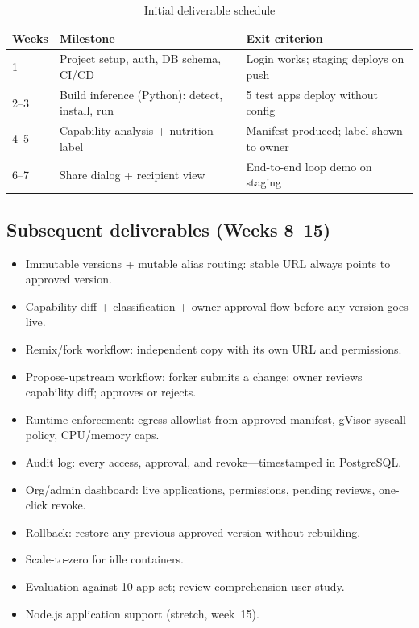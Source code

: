 \documentclass[11pt,a4paper]{article}
\begin{document}
\begin{table}[h]
\centering
\begin{tabular}{@{}p{1.8cm}p{5.8cm}p{5.6cm}@{}}
\toprule
\textbf{Weeks} & \textbf{Milestone} & \textbf{Exit criterion} \\
\midrule
1
  & Project setup, auth, DB schema, CI/CD
  & Login works; staging deploys on push \\
2--3
  & Build inference (Python): detect, install, run
  & 5 test apps deploy without config \\
4--5
  & Capability analysis + nutrition label
  & Manifest produced; label shown to owner \\
6--7
  & Share dialog + recipient view
  & End-to-end loop demo on staging \\
\bottomrule
\end{tabular}
\caption{Initial deliverable schedule}
\end{table}

\subsection{Subsequent deliverables (Weeks 8--15)}

\begin{itemize}[leftmargin=0.7cm]
  \item Immutable versions + mutable alias routing: stable URL always points to
    approved version.
  \item Capability diff + classification + owner approval flow before any version
    goes live.
  \item Remix/fork workflow: independent copy with its own URL and permissions.
  \item Propose-upstream workflow: forker submits a change; owner reviews capability
    diff; approves or rejects.
  \item Runtime enforcement: egress allowlist from approved manifest, gVisor syscall
    policy, CPU/memory caps.
  \item Audit log: every access, approval, and revoke---timestamped in PostgreSQL.
  \item Org/admin dashboard: live applications, permissions, pending reviews,
    one-click revoke.
  \item Rollback: restore any previous approved version without rebuilding.
  \item Scale-to-zero for idle containers.
  \item Evaluation against 10-app set; review comprehension user study.
  \item Node.js application support (stretch, week~15).
\end{itemize}
\end{document}
